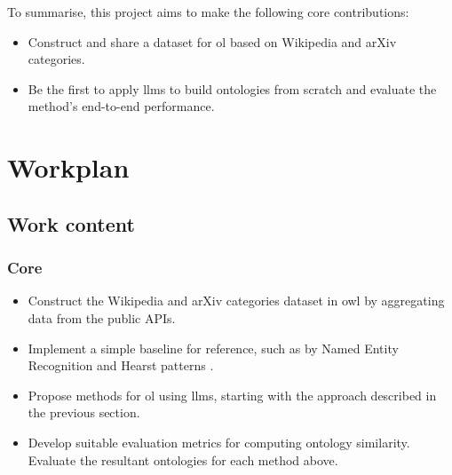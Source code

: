 To summarise, this project aims to make the following core contributions:
\begin{itemize}
    \item Construct and share a dataset for \gls{ol} based on Wikipedia and arXiv categories.
    \item Be the first to apply \gls{llm}s to build ontologies from scratch and evaluate the method's end-to-end performance.
\end{itemize}

\section*{Workplan}

\subsection*{Work content}

\subsubsection*{Core}
\begin{itemize}
    \item Construct the Wikipedia and arXiv categories dataset in \gls{owl} by aggregating data from the public APIs.
    \item Implement a simple baseline for reference, such as by Named Entity Recognition and Hearst patterns \citep{hearst}.
    \item Propose methods for \gls{ol} using \gls{llm}s, starting with the approach described in the previous section.
    \item Develop suitable evaluation metrics for computing ontology similarity. Evaluate the resultant ontologies for each method above.
\end{itemize}

